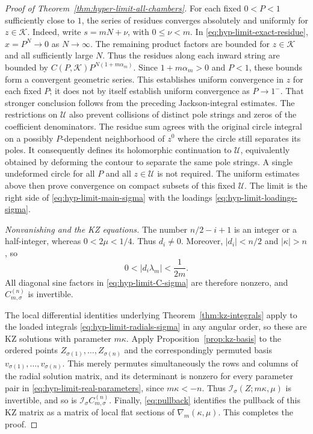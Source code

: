 \documentclass[12pt]{amsart}
\theoremstyle{definition}
\numberwithin{equation}{section}
\theoremstyle{definition}
\let\mc\mathcal
\let\ka\kappa
\let\si\sigma
\let\le\leqslant
\begin{document}
\begin{proof}[Proof of Theorem~\ref{thm:hyper-limit-all-chambers}]
For each fixed $0<P<1$ sufficiently close to $1$,
the series of residues converges absolutely and uniformly
for $z\in\mc K$. Indeed, write $s=mN+\nu$, with
$0\le \nu<m$. In \eqref{eq:hyp-limit-exact-residue},
$x=P^N\to0$ as $N\to\infty$. The remaining product
factors are bounded for $z\in\mc K$ and all sufficiently
large $N$. Thus the residues along each inward string
are bounded by
$C(P,\mc K)P^{N(1+m\alpha_m)}$.
Since $1+m\alpha_m>0$ and $P<1$, these bounds form
a convergent geometric series. This establishes
uniform convergence in $z$ for each fixed $P$;
it does not by itself establish uniform convergence as
$P\to1^-$. That stronger conclusion follows from
the preceding Jackson-integral estimates.
The restrictions on $\mc U$ also prevent collisions of
distinct pole strings and zeros of the coefficient
denominators.
The residue sum agrees with the original circle integral on a
possibly $P$-dependent neighborhood of $z^0$ where the circle
still separates its poles. It consequently defines its
holomorphic continuation to $\mc U$, equivalently obtained by
deforming the contour to separate the same pole strings.
A single undeformed circle for all $P$ and all $z\in\mc U$
is not required. The uniform estimates above then prove
convergence on compact subsets of this fixed $\mc U$.
The limit is the right side of \eqref{eq:hyp-limit-main-sigma}
with the loadings \eqref{eq:hyp-limit-loadings-sigma}.

\medskip
\noindent\emph{Nonvanishing and the KZ equations.}
The number $n/2-i+1$ is an integer or a half-integer, whereas
$0<2\mu<1/4$. Thus $d_i\ne0$. Moreover,
$|d_i|<n/2$ and $|\ka|>n$, so
\[
 0<|d_i\lambda_m|<\frac1{2m}.
\]
All diagonal sine factors in \eqref{eq:hyp-limit-C-sigma}
are therefore nonzero, and $C_{m,\si}^{(n)}$ is invertible.

The local differential identities underlying
Theorem~\ref{thm:kz-integrals} apply to the loaded integrals
\eqref{eq:hyp-limit-radials-sigma} in any angular order, so
these are KZ solutions with parameter $m\ka$.
Apply Proposition~\ref{prop:kz-basis} to the ordered points
$Z_{\si(1)},\ldots,Z_{\si(n)}$ and the correspondingly
permuted basis $v_{\si(1)},\ldots,v_{\si(n)}$.
This merely permutes simultaneously the rows and columns of
the radial solution matrix, and its determinant is nonzero
for every parameter pair in
\eqref{eq:hyp-limit-real-parameters}, since $m\ka<-n$.
Thus $\mc I_\si(Z;m\ka,\mu)$ is invertible, and so is
$\mc I_\si C_{m,\si}^{(n)}$. Finally,
\eqref{eq:pullback} identifies the pullback of this KZ
matrix as a matrix of local flat sections of
$\nabla_m(\ka,\mu)$. This completes the proof.
\end{proof}
\end{document}
